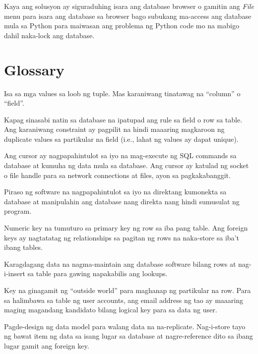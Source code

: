 \documentclass[10pt,]{book}
\providecommand{\tightlist}{%
  \setlength{\itemsep}{0pt}\setlength{\parskip}{0pt}}
\begin{document}
Kaya ang solusyon ay siguraduhing isara ang database browser o gamitin
ang \emph{File} menu para isara ang database sa browser bago subukang
ma-access ang database mula sa Python para maiwasan ang problema ng
Python code mo na mabigo dahil naka-lock ang database.

\section{Glossary}\label{glossary-14}

\begin{description}
\tightlist
\item[attribute]
Isa sa mga values sa loob ng tuple. Mas karaniwang tinatawag na
``column'' o ``field''. 
\item[constraint]
Kapag sinasabi natin sa database na ipatupad ang rule sa field o row sa
table. Ang karaniwang constraint ay pagpilit na hindi maaaring magkaroon
ng duplicate values sa partikular na field (i.e., lahat ng values ay
dapat unique). 
\item[cursor]
Ang cursor ay nagpapahintulot sa iyo na mag-execute ng SQL commands sa
database at kumuha ng data mula sa database. Ang cursor ay katulad ng
socket o file handle para sa network connections at files, ayon sa
pagkakabanggit. 
\item[database browser]
Piraso ng software na nagpapahintulot sa iyo na direktang kumonekta sa
database at manipulahin ang database nang direkta nang hindi sumusulat
ng program. 
\item[foreign key]
Numeric key na tumuturo sa primary key ng row sa iba pang table. Ang
foreign keys ay nagtatatag ng relationships sa pagitan ng rows na
naka-store sa iba't ibang tables. 
\item[index]
Karagdagang data na nagma-maintain ang database software bilang rows at
nag-i-insert sa table para gawing napakabilis ang lookups. 
\index{}
\item[logical key]
Key na ginagamit ng ``outside world'' para maghanap ng partikular na
row. Para sa halimbawa sa table ng user accounts, ang email address ng
tao ay maaaring maging magandang kandidato bilang logical key para sa
data ng user. 
\item[normalization]
Pagde-design ng data model para walang data na na-replicate. Nag-i-store
tayo ng bawat item ng data sa isang lugar sa database at nagre-reference
dito sa ibang lugar gamit ang foreign key. 

\end{description}
\end{document}
